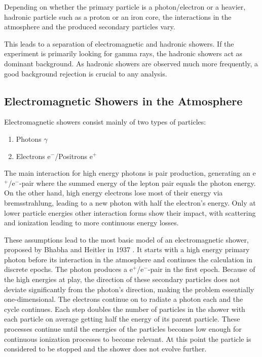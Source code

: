 Depending on whether the primary particle is 
a photon/electron or a heavier, hadronic particle such as a proton 
or an iron core, the interactions in the atmosphere and the 
produced secondary particles vary.

This leads to a separation of electromagnetic and hadronic showers.
If the experiment is primarily looking for gamma rays,
the hadronic showers act as dominant background.
As hadronic showers are observed much more frequently, 
a good background rejection is crucial to any analysis.

\subsection{Electromagnetic Showers in the Atmosphere}
Electromagnetic showers consist mainly of two types of particles:
\begin{enumerate}
	\item{Photons $\gamma$}
	\item{Electrons e$^-$/Positrons e$^+$}
\end{enumerate}

The main interaction for high energy photons is pair 
production, generating an e$^+$/e$^-$-pair where the summed energy of 
the lepton pair equals the photon energy.
On the other hand, high energy electrons lose 
most of their energy via bremsstrahlung, leading to a new photon
with half the electron's energy.
Only at lower particle energies other interaction forms show their impact,
with scattering and ionization 
leading to more continuous energy losses.

These assumptions lead to the most basic model of an 
electromagnetic shower, proposed by Bhabha and Heitler in 1937
\cite{doi:10.1098/rspa.1937.0082}.
It starts with a high energy primary photon before its interaction in the atmosphere 
and continues the calculation in discrete epochs.
The photon produces a e$^+$/e$^-$-pair in the first epoch.
Because of the high energies at play, the direction of these secondary 
particles does not deviate significantly from the photon's direction, 
making the problem essentially one-dimensional.
The electrons continue on to radiate a photon each and the cycle continues.
Each step doubles the number of particles in the shower with each particle 
on average getting half the energy of its parent particle.
These processes continue until the energies of the particles becomes low enough for
continuous ionization processes to become relevant.
At this point the particle is considered to be stopped and the shower
does not evolve further.


